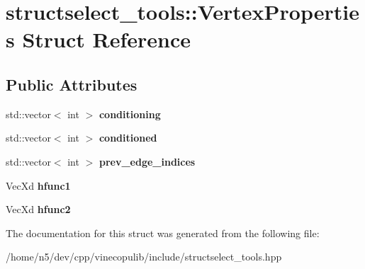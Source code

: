 \hypertarget{structstructselect__tools_1_1_vertex_properties}{}\section{structselect\+\_\+tools\+:\+:Vertex\+Properties Struct Reference}
\label{structstructselect__tools_1_1_vertex_properties}
\subsection*{Public Attributes}
\begin{DoxyCompactItemize}
\item 
std\+::vector$<$ int $>$ {\bfseries conditioning}\hypertarget{structstructselect__tools_1_1_vertex_properties_ae98731fd772dc856678430a58c89a59c}{}\label{structstructselect__tools_1_1_vertex_properties_ae98731fd772dc856678430a58c89a59c}

\item 
std\+::vector$<$ int $>$ {\bfseries conditioned}\hypertarget{structstructselect__tools_1_1_vertex_properties_a55e4762ff80a2764ad3108296461f1eb}{}\label{structstructselect__tools_1_1_vertex_properties_a55e4762ff80a2764ad3108296461f1eb}

\item 
std\+::vector$<$ int $>$ {\bfseries prev\+\_\+edge\+\_\+indices}\hypertarget{structstructselect__tools_1_1_vertex_properties_a4417fead3115618173f27aa82dc2a892}{}\label{structstructselect__tools_1_1_vertex_properties_a4417fead3115618173f27aa82dc2a892}

\item 
Vec\+Xd {\bfseries hfunc1}\hypertarget{structstructselect__tools_1_1_vertex_properties_a02eb01c5bac207cda84e1bb774af31e0}{}\label{structstructselect__tools_1_1_vertex_properties_a02eb01c5bac207cda84e1bb774af31e0}

\item 
Vec\+Xd {\bfseries hfunc2}\hypertarget{structstructselect__tools_1_1_vertex_properties_a4944630229999934498193b125540b72}{}\label{structstructselect__tools_1_1_vertex_properties_a4944630229999934498193b125540b72}

\end{DoxyCompactItemize}


The documentation for this struct was generated from the following file\+:\begin{DoxyCompactItemize}
\item 
/home/n5/dev/cpp/vinecopulib/include/structselect\+\_\+tools.\+hpp\end{DoxyCompactItemize}

